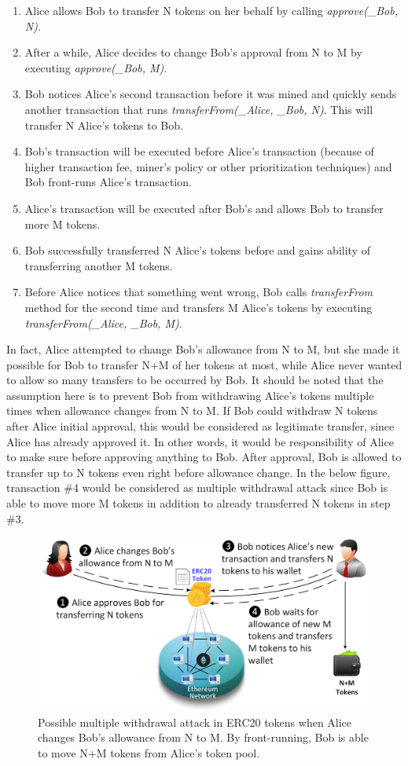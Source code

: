 \begin{enumerate}
	\item Alice allows Bob to transfer N tokens on her behalf by calling \textit{approve(\_Bob, N)}.
	\item After a while, Alice decides to change Bob's approval from N to M by executing \textit{approve(\_Bob, M)}.
	\item Bob notices Alice’s second transaction before it was mined and quickly sends another transaction that runs \textit{transferFrom(\_Alice, \_Bob, N)}. This will transfer N Alice’s tokens to Bob.
	\item Bob’s transaction will be executed before Alice’s transaction (because of higher transaction fee, miner’s policy or other prioritization techniques) and Bob front-runs Alice’s transaction.
	\item Alice’s transaction will be executed after Bob’s and allows Bob to transfer more M tokens.
	\item Bob successfully transferred N Alice’s tokens before and gains ability of transferring another M tokens.
	\item Before Alice notices that something went wrong, Bob calls \textit{transferFrom} method for the second time and transfers M Alice’s tokens by executing \textit{transferFrom(\_Alice, \_Bob, M)}.
\end{enumerate}
In fact, Alice attempted to change Bob’s allowance from N to M, but she made it possible for Bob to transfer N+M of her tokens at most, while Alice never wanted to allow so many transfers to be occurred by Bob. It should be noted that the assumption here is to prevent Bob from withdrawing Alice’s tokens multiple times when allowance changes from N to M. If Bob could withdraw N tokens after Alice initial approval, this would be considered as legitimate transfer, since Alice has already approved it. In other words, it would be responsibility of Alice to make sure before approving anything to Bob. After approval, Bob is allowed to transfer up to N tokens even right before allowance change. In the below figure, transaction \#4 would be considered as multiple withdrawal attack since Bob is able to move more M tokens in addition to already transferred N tokens in step \#3.
\begin{figure}[h]
	\includegraphics[width=1.0\linewidth]{figures/multiple_withdrawal_02.png}
	\caption{Possible multiple withdrawal attack in ERC20 tokens when Alice changes Bob's allowance from N to M. By front-running, Bob is able to move N+M tokens from Alice's token pool.}
\end{figure}

